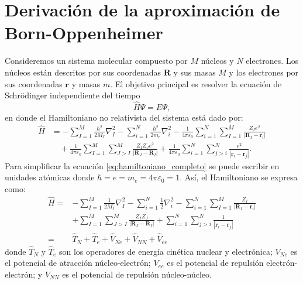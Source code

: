 \chapter{Derivación de la aproximación de Born-Oppenheimer}
\label{app:derivacion_bo}

Consideremos un sistema molecular compuesto por $M$ núcleos y $N$ electrones. Los núcleos están descritos por sus coordenadas $\mathbf{R}$ y sus masas $M$ y los electrones por sus coordenadas $\mathbf{r}$ y masas $m$. El objetivo principal es resolver la ecuación de Schrödinger independiente del tiempo
\begin{equation}
    \hat{H} \Psi = E \Psi,
    \label{eq:schrodinger_independiente_tiempo}
\end{equation}
en donde el Hamiltoniano no relativista del sistema está dado por:
\begin{equation}
\begin{split}
    \hat{H} &= - \sum_{I=1}^{M} \frac{\hbar^2}{2M_I} \nabla^2_I
       - \sum_{i=1}^{N} \frac{\hbar^2}{2m_e} \nabla^2_i 
       - \frac{1}{4\pi\varepsilon_0} \sum_{i=1}^{N} \sum_{I=1}^{M} \frac{Z_I e^2}{\left| \mathbf{R}_I - \mathbf{r}_i \right|} \\
      &\quad + \frac{1}{4\pi\varepsilon_0} \sum_{I=1}^{M} \sum_{J>I}^M \frac{Z_I Z_J e^2}{\left| \mathbf{R}_J  - \mathbf{R}_I \right|} 
      + \frac{1}{4\pi\varepsilon_0} \sum_{i=1}^{N} \sum_{j>i}^{N} \frac{e^2}{\left| \mathbf{r}_i - \mathbf{r}_j \right|}. 
\end{split}
\label{eq:hamiltoniano_completo}
\end{equation}
Para simplificar la ecuación \ref{eq:hamiltoniano_completo} se puede escribir en unidades atómicas donde $\hbar = e = m_e = 4\pi\varepsilon_0 = 1$. Así, el Hamiltoniano se expresa como:
\begin{equation} \label{eq:hamiltoniano_au}
\begin{split}
    \hat{H} = & - \sum_{I=1}^{M} \frac{1}{2M_I} \nabla^2_I - \sum_{i=1}^{N} \frac{1}{2} \nabla^2_i - \sum_{i=1}^{N} \sum_{I=1}^{M} \frac{Z_I}{|\mathbf{R}_I - \mathbf{r}_i|} \\
    & + \sum_{I=1}^{M} \sum_{J>I}^{M} \frac{Z_I Z_J}{|\mathbf{R}_J - \mathbf{R}_I|} + \sum_{i=1}^{N} \sum_{j>i}^{N} \frac{1}{|\mathbf{r}_i - \mathbf{r}_j|} \\
    = & \hat{T}_N + \hat{T}_e + \hat{V}_{Ne} + \hat{V}_{NN} + \hat{V}_{ee}
\end{split}
\end{equation}
donde $\hat{T}_N$ y $\hat{T}_e$ son los operadores de energía cinética nuclear y electrónica; $V_{Ne}$ es el potencial de atracción núcleo-electrón; $V_{ee}$ es el potencial de repulsión electrón-electrón; y $V_{NN}$ es el potencial de repulsión núcleo-núcleo.

